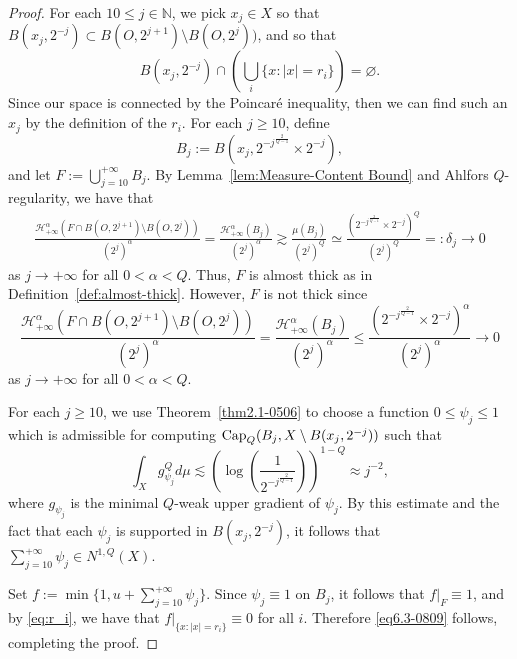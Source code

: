 \documentclass[10pt,a4paper]{amsart}
\newcommand{\Ha}{\mathcal{H}}
\begin{document}
\begin{proof}
 For each $10\leq j\in\mathbb N$, we pick $x_j\in X$ so that $B(x_j,2^{-j})\subset B(O,2^{j+1})\setminus B(O,2^j))$, and so that 
 \begin{equation}\label{eq:r_i}B(x_j, 2^{-j})\cap\left(\bigcup_i\{x:|x|=r_i\}\right)=\varnothing.
 \end{equation}
  Since our space is connected by the Poincar\'e inequality,  then we  can find such an $x_j$   by the definition of the $r_i$.  For each $j\ge 10$, define 
 $$B_j:=B(x_j,2^{-j^{\frac{2}{Q-1}}}\times 2^{-j}),$$
 and let $F:=\bigcup_{j=10}^{+\infty}B_j$. By Lemma~\ref{lem:Measure-Content Bound} and Ahlfors $Q$-regularity, we have that  
\begin{align*}
\frac{\mathcal H^{\alpha}_{+\infty}(F\cap B(O,2^{j+1})\setminus B(O,2^j))}{(2^j)^\alpha}=\frac{\Ha^{\alpha}_{+\infty}(B_j)}{(2^j)^\alpha}\gtrsim\frac{\mu(B_j)}{(2^j)^Q}\simeq\frac{(2^{-j^{\frac{2}{Q-1}}}\times2^{-j})^Q}{(2^j)^Q}=:\delta_j\to 0
\end{align*}
as $j\to+\infty$ for all $0<\alpha<Q$.  Thus, $F$ is almost thick as in Definition~\ref{def:almost-thick}. However, $F$ is not thick since 
\[
\frac{\mathcal H^{\alpha}_{+\infty}(F\cap B(O,2^{j+1})\setminus B(O,2^j))}{(2^j)^\alpha}=\frac{\Ha^{\alpha}_{+\infty}(B_j)}{(2^j)^\alpha}\le \frac{(2^{-j^{\frac{2}{Q-1}}}\times2^{-j})^\alpha}{(2^j)^\alpha}\to 0
\]
as $j\to+\infty$ for all $0<\alpha<Q$.

For each $j\geq 10$, we use Theorem~\ref{thm2.1-0506} to choose a function $0\le\psi_j\le 1$ which is admissible for computing $\text{\rm Cap}_Q(B_j, X\setminus B(x_j,2^{-j}))$ such that $$\int_Xg_{\psi_j}^Qd\mu\lesssim \left( \log \left(\frac{1}{2^{-j^{\frac{2}{Q-1}}}}\right)\right)^{1-Q}\approx j^{-2},$$ where $g_{\psi_j}$ is the minimal $Q$-weak upper gradient of $\psi_j$.  By this estimate and the fact that each $\psi_j$ is supported in $B(x_j,2^{-j})$, it follows that $\sum_{j=10}^{+\infty}\psi_j\in  N^{1,Q}(X)$. 

Set $f:=\min\{1, u+\sum_{j=10}^{+\infty}\psi_j\}$.  Since $\psi_j\equiv 1$ on $B_j$, it follows that $f|_F\equiv 1$, and by \eqref{eq:r_i}, we have that $f|_{\{x:|x|=r_i\}}\equiv 0$ for all $i$.  Therefore \eqref{eq6.3-0809} follows, completing the proof. 
 \end{proof}
\end{document}
